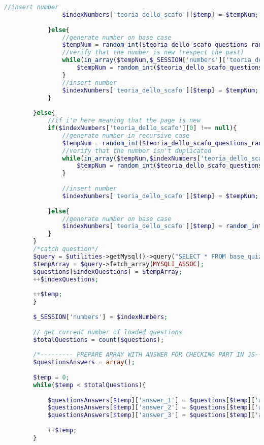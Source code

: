 \begin{lstlisting}[language=php]
				//insert number
				$indexNumbers['teoria_dello_scafo'][$temp] = $tempNum;
				
			}else{
				//generate number on base case
				$tempNum = random_int($teoria_dello_scafo_questions_range['min'], $teoria_dello_scafo_questions_range['max']);
				//verify that the number is new (respect the past)
				while(in_array($tempNum,$_SESSION['numbers']['teoria_dello_scafo'])){
					$tempNum = random_int($teoria_dello_scafo_questions_range['min'], $teoria_dello_scafo_questions_range['max']);
				}
				//insert number
				$indexNumbers['teoria_dello_scafo'][$temp] = $tempNum;
			}
			
		}else{
			//if i'm here meaning that the page is new
			if($indexNumbers['teoria_dello_scafo'][0] !== null){
				//generate number in recursive case
				$tempNum = random_int($teoria_dello_scafo_questions_range['min'], $teoria_dello_scafo_questions_range['max']);
				//verify that the number isn't duplicated
				while(in_array($tempNum,$indexNumbers['teoria_dello_scafo'])){
					$tempNum = random_int($teoria_dello_scafo_questions_range['min'], $teoria_dello_scafo_questions_range['max']);
				}
				
				//insert number
				$indexNumbers['teoria_dello_scafo'][$temp] = $tempNum;
				
			}else{
				//generate number on base case
				$indexNumbers['teoria_dello_scafo'][$temp] = random_int($teoria_dello_scafo_questions_range['min'], $teoria_dello_scafo_questions_range['max']);
			}
		}
		/*catch question*/
		$query = $utilities->getMysql()->query("SELECT * FROM base_quiz WHERE (id = '{$indexNumbers['teoria_dello_scafo'][$temp]}')");
		$tempArray = $query->fetch_array(MYSQLI_ASSOC);
		$questions[$indexQuestions] = $tempArray;
		++$indexQuestions;
		
		++$temp;
		}
		
		$_SESSION['numbers'] = $indexNumbers;
		
		// get current number of loaded questions
		$totalQuestions = count($questions);
		
		/*--------- PREPARE ARRAY WITH ANSWER FOR CHECKING PART IN JS---------*/
		$questionsAnswers = array();
		
		$temp = 0;
		while($temp < $totalQuestions){
			
			$questionsAnswers[$temp]['answer_1'] = $questions[$temp]['answer_1'];
			$questionsAnswers[$temp]['answer_2'] = $questions[$temp]['answer_2'];
			$questionsAnswers[$temp]['answer_3'] = $questions[$temp]['answer_3'];
			
			++$temp;
		}
\end{lstlisting}
